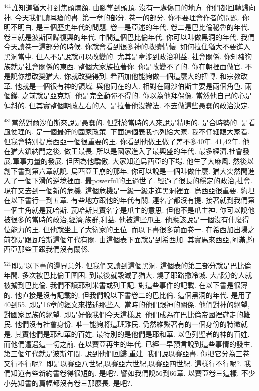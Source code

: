 \documentclass{book}
\begin{document}
$^{441}$誰知道猶大打到焦頭爛額.
由腳掌到頭頂.
沒有一處傷口的地方.
他們都回轉歸向神.
今天我們讀耳瘡的書.
第一章的部分.
卷一的部分.
你不要理會作者的問題.
你明不明白.
是三個歷史年代的問題.
卷一是亞述的年代.
卷二是巴比倫秘魯的年代.
卷三就是波斯回歸復興的年代.
中間這個巴比倫年代.
你可以叫做黑洞的年代.
我們今天讀卷一這部分的時候.
你就會看到很多神的救贖情懷.
如何拉住猶大不要進入黑洞當中.
但人不是說就可以改變的.
尤其是牽涉到政治利益.
社會關係.
你知豬狗族就是社會關係的東西.
整個大家族拉著你.
你是改變不了的.
你在朝裡面做官.
不是說你想改變猶大.
你就改變得到.
希西加他能夠做一個這麼大的扭轉.
和宗教改革.
他就是一個很有神的領域.
與他同在的人.
相對在爾沙伯斯主要是兩個角色.
兩個鑊.
之前就是亞克斯.
他是完全動彈不得的.
你以為他拜偶像.
當然他自己的心是偏斜的.
但其實整個朝政左右的人.
是拉著他沒辦法.
不去做這些愚蠢的政治決定.

$^{481}$當然對爾沙伯斯來說是愚蠢的.
但對於當時的人來說是精明的.
是合時勢的.
是看風使理的.
是一個最好的國家政策.
下面這個表我也列給大家.
我不仔細跟大家看.
但我會特別提烏西亞一個很重要的王.
你看到他做王做了差不多40年.
41,42年.
他在猶大鎖納門之後.
做王最長.
所以是國家進入了最興盛的年代.
最多經濟,社會發展,軍事力量的發展.
但因為他驕傲.
大家知道烏西亞的下場.
他生了大麻風.
然後以創下書到第六章就說.
烏西亞王崩的那年.
你可以說是一個叫做什麼.
猶大突然間進入了一個下滑的逆境裡面.
最powerful的王過世了.
經過了很長的穩定的政治,社會.
現在又去到一個新的危機.
這個危機是一級一級走進黑洞裡面.
烏西亞很重要.
約坦在以下書行一到五章.
有些地方跟他的年代有關.
連名字都沒有提.
接著就到我們第一個主角就是瓦哈斯.
瓦哈斯其實名字是爪主的意思.
但他不是爪主神.
你可以說他被很多的當時的政治,經濟,族群,利益.
他被這些爪主.
他應該說是一個沒有什麼得位能力的王.
但他就坐上了大衛家的王位.
而以下書很多前面卷一.
在希西加出場之前都是跟瓦哈斯這個年代有關.
由這個表下面就是到希西加.
其實馬來西亞,阿滿,約西亞那些王跟我們沒有關係.

$^{521}$即是以下書的邊界意外.
但我們又讀到這個黑洞.
這個表的第三部分就是巴比倫年間.
多次被巴比倫王圍困.
到最後就毀滅了猶大.
燒了耶路撒冷城.
大部分的人就被擄到巴比倫.
我們不讀耶利米書或列王記.
對這些事件的記載.
在以下書是很薄的.
他直接是沒有記載的.
但我們說以下書卷二的巴比倫.
這個黑洞的年代.
是用了40到55.
即是16章的經文來描述那些人.
當時的他們跟神的關係.
他們對神的絕望,對國家民族的絕望.
即是好像我們今天這樣說.
他們成為在巴比倫帝國裡遊走的難民.
他們沒有社會身份.
唯一能夠將這班難民.
仍然維繫著有的一個身份的特徵就是.
其實他們是耶和華的百姓.
最特別的是他們是耶和華.
以色列聖者的神的百姓.
而他們遭遇這一切之前.
在以賽亞再生的年代.
已經一早預言說到這些事情的發生.
第三個年代就是波斯年間.
說到他們回歸,重建.
我們說以賽亞書.
你把它分為三卷又行不行呢?.
即是以賽亞八世紀,以賽亞六世紀,以賽亞四世紀.
這樣行不行呢?.
我們知道有些新約書卷得很短的.
是吧?.
譬如我們說56到66章.
以賽亞卷三這樣.
不少小先知書的篇幅都沒有卷三那麼長.
是吧?.
\end{document}
